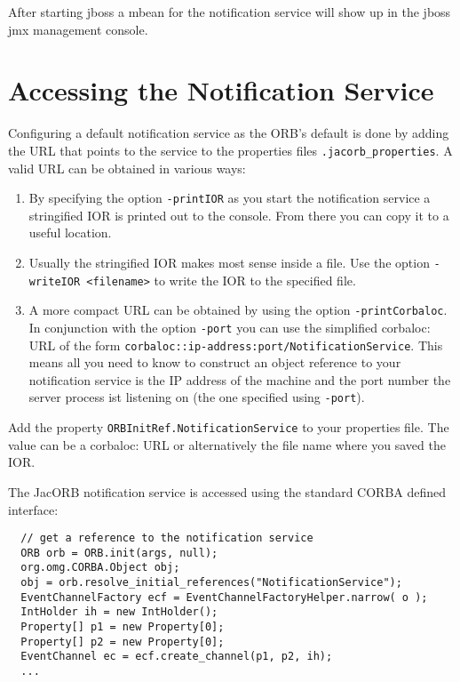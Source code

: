 After starting jboss a mbean for the notification service will show up in
the jboss jmx management console.

\section{Accessing the Notification Service}
\label{sec:access-notif-serv}

Configuring a default notification service as the ORB's default is done
by adding the URL that points to the service to the properties files
\texttt{.jacorb\_properties}. A valid URL can be obtained in various ways:
\begin{enumerate}
\item By specifying the option \texttt{-printIOR} as you start the
  notification service a stringified IOR is printed out to the
  console. From there you can copy it to a useful location.

\item Usually the stringified IOR makes most sense inside a file. Use
  the option \texttt{-writeIOR <filename>} to write the IOR to the specified
  file.

\item A more compact URL can be obtained by using the
  option \texttt{-printCorbaloc}. In conjunction with the option
  \texttt{-port} you can use the simplified corbaloc: URL of the form
  \texttt{corbaloc::ip-address:port/NotificationService}. This means
  all you need to know to construct an object reference to your
  notification service is the IP address of the machine and the port
  number the server process ist listening on (the one specified using
  \texttt{-port}).

\end{enumerate}

Add the property \texttt{ORBInitRef.NotificationService} to your
properties file. The value can be a corbaloc: URL or alternatively the
file name where you saved the IOR.

The JacORB notification service is accessed using the standard CORBA
defined interface:

\small{
\begin{verbatim}
  // get a reference to the notification service
  ORB orb = ORB.init(args, null);
  org.omg.CORBA.Object obj;
  obj = orb.resolve_initial_references("NotificationService");
  EventChannelFactory ecf = EventChannelFactoryHelper.narrow( o );
  IntHolder ih = new IntHolder();
  Property[] p1 = new Property[0];
  Property[] p2 = new Property[0];
  EventChannel ec = ecf.create_channel(p1, p2, ih);
  ...
\end{verbatim}
}

